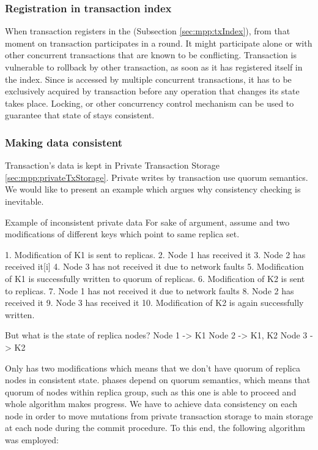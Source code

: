 \subsubsection{Registration in transaction index}
When transaction registers in the \txIndex (Subsection \ref{sec:mpp:txIndex}), from that moment on transaction participates in a \paxos round.
It might participate alone or with other concurrent transactions that are known to be conflicting. 
Transaction is vulnerable to rollback by other transaction, as soon as it has registered itself in the index.
Since \txIndex is accessed by multiple concurrent transactions, it has to be exclusively acquired by transaction before any operation that changes its state takes place. 
Locking, or other concurrency control mechanism can be used to guarantee that state of \txIndex stays consistent.


        
\subsubsection{Making data consistent}
Transaction’s data is kept in Private Transaction Storage \ref{sec:mpp:privateTxStorage}. Private writes by transaction use quorum semantics. We would like to present an example which argues why consistency checking is inevitable.


Example of inconsistent private data
For sake of argument, assume  and two modifications of different keys which point to same replica set.


1. Modification of K1 is sent to replicas.
2. Node 1 has received it
3. Node 2 has received it[i]
4. Node 3 has not received it due to network faults
5. Modification of K1 is successfully written to quorum of replicas.
6. Modification of K2 is sent to replicas.
7. Node 1 has not received it due to network faults
8. Node 2 has received it
9. Node 3 has received it
10. Modification of K2 is again successfully written.


But what is the state of replica nodes?
Node 1 -> { K1 }
Node 2 -> { K1, K2 }
Node 3 -> { K2 }


Only  has two modifications which means that we don’t have quorum of replica nodes in consistent state. \paxos phases depend on quorum semantics, which means that quorum of nodes within replica group, such as this one is able to proceed and whole algorithm makes progress. 
We have to achieve data consistency on each node in order to move mutations from private transaction storage to main storage at each node during the commit procedure. To this end, the following algorithm was employed:

